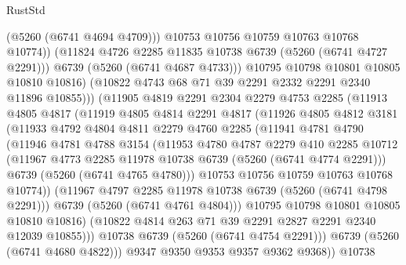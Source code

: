\begin{lexlean}{RustStd}
\begin{coremodule}
                        (@5260 (@6741 @4694 @4709)))
                      @10753
                      @10756
                      @10759
                      @10763
                      @10768
                      @10774))
                  (@11824 @4726 @2285 @11835 @10738 @6739 (@5260 (@6741 @4727 @2291)))
                  @6739
                  (@5260 (@6741 @4687 @4733)))
                @10795
                @10798
                @10801
                @10805
                @10810
                @10816)
              (@10822 @4743 @68 @71 @39 @2291 @2332 @2291 @2340 @11896 @10855)))
          (@11905
            @4819
            @2291
            @2304
            @2279
            @4753
            @2285
            (@11913
              @4805
              @4817
              (@11919
                @4805
                @4814
                @2291
                @4817
                (@11926
                  @4805
                  @4812
                  @3181
                  (@11933
                    @4792
                    @4804
                    @4811
                    @2279
                    @4760
                    @2285
                    (@11941
                      @4781
                      @4790
                      (@11946
                        @4781
                        @4788
                        @3154
                        (@11953
                          @4780
                          @4787
                          @2279
                          @410
                          @2285
                          @10712
                          (@11967 @4773 @2285 @11978 @10738 @6739 (@5260 (@6741 @4774 @2291)))
                          @6739
                          (@5260 (@6741 @4765 @4780)))
                        @10753
                        @10756
                        @10759
                        @10763
                        @10768
                        @10774))
                    (@11967 @4797 @2285 @11978 @10738 @6739 (@5260 (@6741 @4798 @2291)))
                    @6739
                    (@5260 (@6741 @4761 @4804)))
                  @10795
                  @10798
                  @10801
                  @10805
                  @10810
                  @10816)
                (@10822 @4814 @263 @71 @39 @2291 @2827 @2291 @2340 @12039 @10855)))
            @10738
            @6739
            (@5260 (@6741 @4754 @2291)))
          @6739
          (@5260 (@6741 @4680 @4822)))
        @9347
        @9350
        @9353
        @9357
        @9362
        @9368))
    @10738

\end{coremodule}
\end{lexlean}
